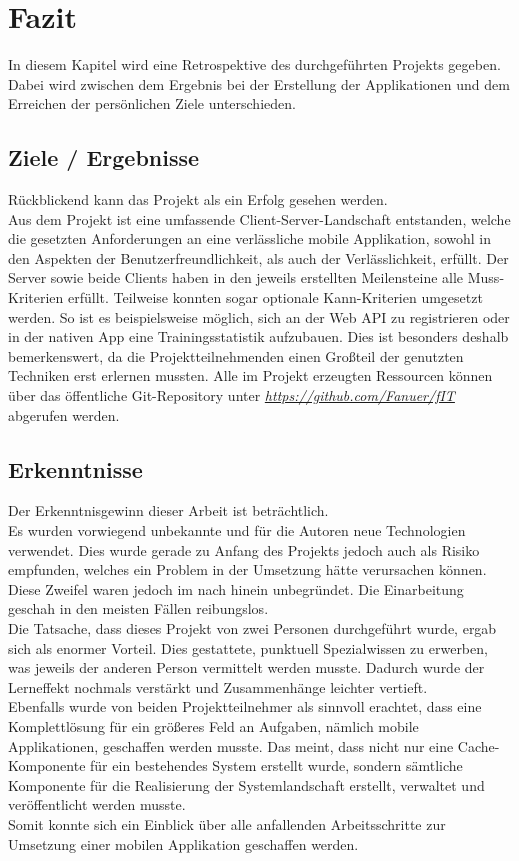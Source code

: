\chapter{Fazit}
\label{fazit}
In diesem Kapitel wird eine Retrospektive des durchgeführten Projekts gegeben. Dabei wird zwischen dem Ergebnis bei der Erstellung der Applikationen und dem Erreichen der persönlichen Ziele unterschieden.
\section{Ziele / Ergebnisse}
\label{sec:ziele-ergebnisse}
Rückblickend kann das Projekt als ein Erfolg gesehen werden. \\
Aus dem Projekt ist eine umfassende Client-Server-Landschaft entstanden, welche die gesetzten Anforderungen an eine verlässliche mobile Applikation, sowohl in den Aspekten der Benutzerfreundlichkeit, als auch der Verlässlichkeit, erfüllt. Der Server sowie beide Clients haben in den jeweils erstellten Meilensteine alle Muss-Kriterien erfüllt. Teilweise konnten sogar optionale Kann-Kriterien umgesetzt werden. So ist es beispielsweise möglich, sich an der Web \ac{API} zu registrieren oder in der nativen \gls{App} eine Trainingsstatistik aufzubauen. 
Dies ist besonders deshalb bemerkenswert, da die Projektteilnehmenden einen Großteil der genutzten Techniken erst erlernen mussten. 
Alle im Projekt erzeugten Ressourcen können über das öffentliche Git-Repository unter \textit{\href{https://github.com/Fanuer/fIT}{https://github.com/Fanuer/fIT}} abgerufen werden. 
\section{Erkenntnisse}
\label{sec:erkenntnisse}
Der Erkenntnisgewinn dieser Arbeit ist beträchtlich. \\
Es wurden vorwiegend unbekannte und für die Autoren neue Technologien verwendet. Dies wurde gerade zu Anfang des Projekts jedoch auch als Risiko empfunden, welches ein Problem in der Umsetzung hätte verursachen können. Diese Zweifel waren jedoch im nach hinein unbegründet. Die Einarbeitung geschah in den meisten Fällen reibungslos.\\
Die Tatsache, dass dieses Projekt von zwei Personen durchgeführt wurde, ergab sich als enormer Vorteil. Dies gestattete, punktuell Spezialwissen zu erwerben, was jeweils der anderen Person vermittelt werden musste. Dadurch wurde der Lerneffekt nochmals verstärkt und Zusammenhänge leichter vertieft.\\
Ebenfalls wurde von beiden Projektteilnehmer als sinnvoll erachtet, dass eine Komplettlösung für ein größeres Feld an Aufgaben, nämlich mobile Applikationen, geschaffen werden musste. Das meint, dass nicht nur eine Cache-Komponente für ein bestehendes System erstellt wurde, sondern sämtliche Komponente für die Realisierung der Systemlandschaft erstellt, verwaltet und veröffentlicht werden musste.\\
Somit konnte sich ein Einblick über alle anfallenden Arbeitsschritte zur Umsetzung einer mobilen Applikation geschaffen werden. 
